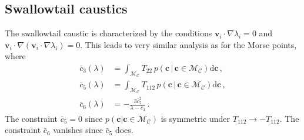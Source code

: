 \documentclass[a4paper, 11pt]{article}
\begin{document}
\subsection{Swallowtail caustics}
The swallowtail caustic is characterized by the conditions $\bm{v}_i \cdot \nabla \lambda_i=0$ and $\bm{v}_i \cdot \nabla (\bm{v}_i \cdot \nabla \lambda_i)=0$. This leads to very similar analysis as for the Morse points, where
\begin{align}
\bar{c}_3(\lambda)&= \int_{\mathcal{M}_\mathcal{C}} T_{22}\,p(\bm{c}\,|\,\bm{c}\in \mathcal{M}_\mathcal{C})\mathrm{d}\bm{c}\,,\\
\bar{c}_5(\lambda)&= \int_{\mathcal{M}_\mathcal{C}} T_{112}\,p(\bm{c}\,|\,\bm{c}\in \mathcal{M}_\mathcal{C})\mathrm{d}\bm{c}\,,\\
\bar{c}_6(\lambda)&= -\frac{3 \bar{c}_5^2}{\lambda - \bar{c}_3} \,.
\end{align}
The constraint $\bar{c}_5=0$ since $p(\bm{c}|\bm{c}\in \mathcal{M}_{\mathcal{C}})$ is symmetric under $T_{112}\to -T_{112}$. The constraint $\bar{c}_6$ vanishes since $\bar{c}_5$ does. 

\end{document}
